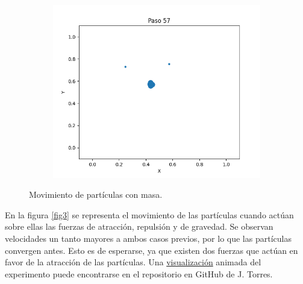 \documentclass{report}
\begin{document}
\begin{figure}[h]
\begin{subfigure}[b]{0.3\textwidth}
         \includegraphics[width=\textwidth]{Images/Images_m/p9pm_t57.png}
     \end{subfigure}
     \caption{Movimiento de part\'iculas con masa.}
     \label{fig2}
\end{figure}

\newpage

En la figura \ref{fig3} se representa el movimiento de las part\'iculas cuando act\'uan sobre ellas las fuerzas de atracci\'on, repulsi\'on y de gravedad. Se observan velocidades un tanto mayores a ambos casos previos, por lo que las part\'iculas convergen antes. Esto es de esperarse, ya que existen dos fuerzas que act\'uan en favor de la atracci\'on de las part\'iculas. Una \href{https://github.com/FeroxDeitas/Simulacion-Nano/blob/main/Tareas/P9/Images/images_mc/movement_mc.gif}{visualizaci\'on} animada del experimento puede encontrarse en el repositorio en GitHub de J. Torres.
\end{document}
